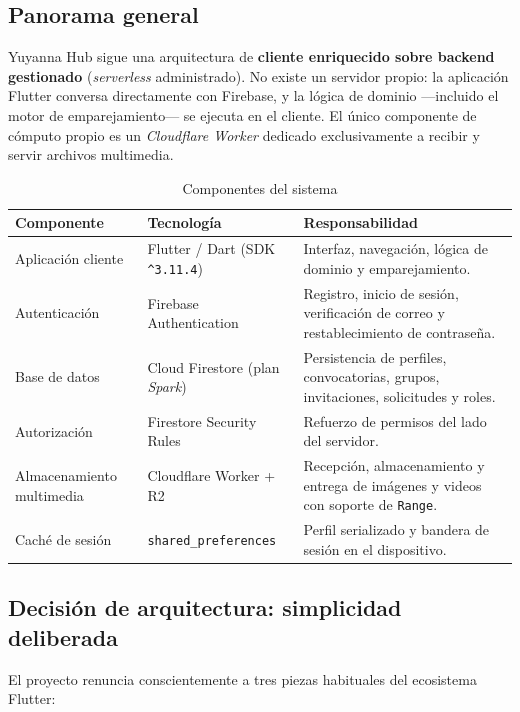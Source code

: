 \documentclass[12pt,a4paper]{article}
\begin{document}
\subsection{Panorama general}
Yuyanna Hub sigue una arquitectura de \textbf{cliente enriquecido sobre backend gestionado} (\emph{serverless} administrado). No existe un servidor propio: la aplicación Flutter conversa directamente con Firebase, y la lógica de dominio ---incluido el motor de emparejamiento--- se ejecuta en el cliente. El único componente de cómputo propio es un \emph{Cloudflare Worker} dedicado exclusivamente a recibir y servir archivos multimedia.

\begin{table}[htbp]
\centering
\caption{Componentes del sistema}
\begin{tabular}{L{3.9cm}L{4.2cm}L{5.4cm}}
\toprule
\textbf{Componente} & \textbf{Tecnología} & \textbf{Responsabilidad} \\
\midrule
Aplicación cliente & Flutter / Dart (SDK \texttt{\^{}3.11.4}) & Interfaz, navegación, lógica de dominio y emparejamiento. \\
Autenticación & Firebase Authentication & Registro, inicio de sesión, verificación de correo y restablecimiento de contraseña. \\
Base de datos & Cloud Firestore (plan \emph{Spark}) & Persistencia de perfiles, convocatorias, grupos, invitaciones, solicitudes y roles. \\
Autorización & Firestore Security Rules & Refuerzo de permisos del lado del servidor. \\
Almacenamiento multimedia & Cloudflare Worker + R2 & Recepción, almacenamiento y entrega de imágenes y videos con soporte de \texttt{Range}. \\
Caché de sesión & \texttt{shared\_preferences} & Perfil serializado y bandera de sesión en el dispositivo. \\
\bottomrule
\end{tabular}
\end{table}

\subsection{Decisión de arquitectura: simplicidad deliberada}
El proyecto renuncia conscientemente a tres piezas habituales del ecosistema Flutter:
\end{document}
